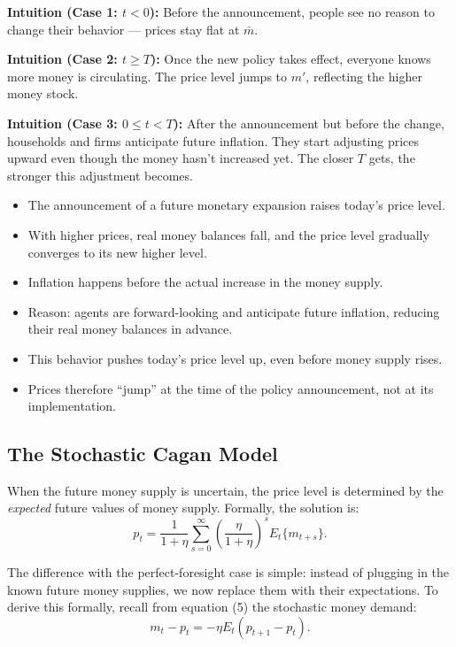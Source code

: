 \documentclass[12pt]{article}
\begin{document}
\textbf{Intuition (Case 1: $t<0$):} Before the announcement, people see no reason to change their behavior — prices stay flat at $\bar m$.  

\textbf{Intuition (Case 2: $t \geq T$):} Once the new policy takes effect, everyone knows more money is circulating. The price level jumps to $m'$, reflecting the higher money stock.  

\textbf{Intuition (Case 3: $0 \leq t < T$):} After the announcement but before the change, households and firms anticipate future inflation. They start adjusting prices upward even though the money hasn’t increased yet. The closer $T$ gets, the stronger this adjustment becomes.  

\begin{itemize}
    \item The announcement of a future monetary expansion raises today’s price level.  
    \item With higher prices, real money balances fall, and the price level gradually converges to its new higher level.  
    \item Inflation happens before the actual increase in the money supply.  
    \item Reason: agents are forward-looking and anticipate future inflation, reducing their real money balances in advance.  
    \item This behavior pushes today’s price level up, even before money supply rises.  
    \item Prices therefore “jump” at the time of the policy announcement, not at its implementation.  
\end{itemize}

\subsection*{\noindent\textbf{The Stochastic Cagan Model}}

\noindent
When the future money supply is uncertain, the price level is determined by the \textit{expected} future values of money supply.  
Formally, the solution is: 
\[
p_t = \frac{1}{1+\eta} \sum_{s=0}^\infty \left(\frac{\eta}{1+\eta}\right)^s E_t\{m_{t+s}\}.
\]

\noindent
The difference with the perfect-foresight case is simple: instead of plugging in the known future money supplies, we now replace them with their expectations.  
To derive this formally, recall from equation (5) the stochastic money demand:
\[
m_t - p_t = -\eta E_t(p_{t+1} - p_t).
\]
\end{document}
